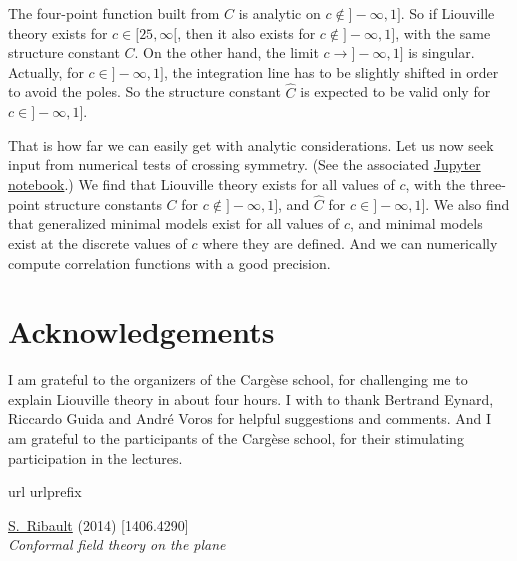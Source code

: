 \documentclass[12pt, a4paper]{article}
\theoremstyle{break}
\begin{document}
The four-point function built from $C$ is analytic on $c\notin ]-\infty,1]$. So if Liouville theory exists for $c\in [25,\infty[$, then it also exists for $c\notin ]-\infty,1]$, with the same structure constant $C$. 
On the other hand, the limit $c\to ]-\infty, 1]$ is singular. Actually, for $c\in ]-\infty, 1]$, the integration line has to be slightly shifted in order to avoid the poles. So the structure constant $\hat C$ is expected to be valid only for $c\in ]-\infty, 1]$.

That is how far we can easily get with analytic considerations. 
Let us now seek input from numerical tests of crossing symmetry. (See the associated \href{https://github.com/ribault/bootstrap-2d-Python/blob/master/Liouville_demo_2.ipynb}{Jupyter notebook}.)
We find that Liouville theory exists for all values of $c$, with the three-point structure constants $C$ for $c\notin ]-\infty,1]$, and $\hat C$ for $c\in ]-\infty, 1]$. 
We also find that generalized minimal models exist for all values of $c$, and minimal models exist at the discrete values of $c$ where they are defined. 
And we can numerically compute correlation functions with a good precision.

\section*{Acknowledgements}

I am grateful to the organizers of the Carg\`ese school, for challenging me to explain Liouville theory in about four hours.
I with to thank Bertrand Eynard, Riccardo Guida and Andr\'e Voros for helpful suggestions and comments.
And I am grateful to the participants of the Carg\`ese school, for their stimulating participation in the lectures.

\begin{thebibliography}{1}
\expandafter\ifx\csname url\endcsname\relax
  \def\url#1{\texttt{#1}}\fi
\expandafter\ifx\csname urlprefix\endcsname\relax\def\urlprefix{URL }\fi
\providecommand{\eprint}[2][]{\url{#2}}

\href{http://arxiv.org/abs/1406.4290}{S.~Ribault} (2014) [1406.4290]\\ {\em
  {Conformal field theory on the plane}\/}

\end{thebibliography}
\end{document}
